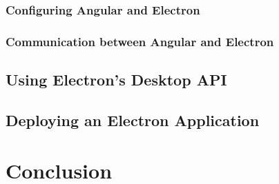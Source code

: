 \documentclass[11pt]{article}
\begin{document}
    \subsubsection{Configuring Angular and Electron}\label{subsubsec:developing-with-electron-angular-config}
    

    \subsubsection{Communication between Angular and Electron}\label{subsubsec:developing-with-electron-angular-communication}
    
    \clearpage

    \subsection{Using Electron's Desktop API}\label{subsec:developing-with-electron-angular-api}
    

    \subsection{Deploying an Electron Application}\label{subsec:developing-with-electron-angular-deployment}
    
    \clearpage

    \section{Conclusion}\label{sec:conclusion}
    
    \clearpage

    \titleformat{\section}{\bfseries\sffamily\large\MakeUppercase}{\thesection}{0pt}{\quad}{}%
    \printnoidxglossary[type=\acronymtype]
    \clearpage
    \listoffigures
    \clearpage
    \lstlistoflistings
    \clearpage
    \printbibliography
    
    
\end{document}
